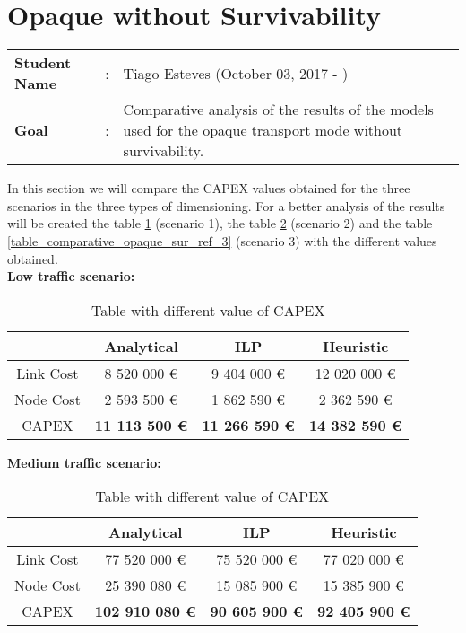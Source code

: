 \clearpage

\section{Opaque without Survivability}\label{comparative_Opaque_Survivability}
\begin{tcolorbox}	
\begin{tabular}{p{2.75cm} p{0.2cm} p{10.5cm}} 	
\textbf{Student Name}  &:& Tiago Esteves    (October 03, 2017 - )\\
\textbf{Goal}          &:& Comparative analysis of the results of the models used for the opaque transport mode without survivability.
\end{tabular}
\end{tcolorbox}
\vspace{11pt}


In this section we will compare the CAPEX values obtained for the three scenarios in the three types of dimensioning. For a better analysis of the results will be created the table \ref{table_comparative_opaque_sur_ref_1} (scenario 1), the table \ref{table_comparative_opaque_sur_ref_2} (scenario 2) and the table \ref{table_comparative_opaque_sur_ref_3} (scenario 3) with the different values obtained.\\

\textbf{Low traffic scenario:}

\begin{table}[h!]
\centering
\begin{tabular}{| c | c | c | c |}
 \hline
   & Analytical & ILP & Heuristic \\
 \hline\hline
 Link Cost & 8 520 000 \euro & 9 404 000 \euro & 12 020 000 \euro \\
 Node Cost & 2 593 500 \euro & 1 862 590 \euro & 2 362 590 \euro \\
 CAPEX & \textbf{11 113 500 \euro} & \textbf{11 266 590 \euro} & \textbf{14 382 590 \euro} \\
 \hline
\end{tabular}
\caption{Table with different value of CAPEX }
\label{table_comparative_opaque_sur_ref_1}
\end{table}


\vspace{11pt}
\textbf{Medium traffic scenario:}

\begin{table}[h!]
\centering
\begin{tabular}{| c | c | c | c |}
 \hline
   & Analytical & ILP & Heuristic \\
 \hline\hline
 Link Cost & 77 520 000 \euro & 75 520 000 \euro & 77 020 000 \euro \\
 Node Cost & 25 390 080 \euro & 15 085 900 \euro & 15 385 900 \euro \\
 CAPEX & \textbf{102 910 080 \euro} & \textbf{90 605 900 \euro} & \textbf{92 405 900 \euro} \\
 \hline
\end{tabular}
\caption{Table with different value of CAPEX }
\label{table_comparative_opaque_sur_ref_2}
\end{table}


